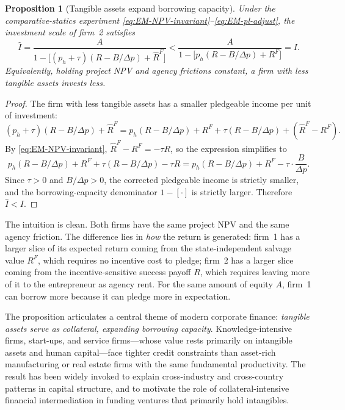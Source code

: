 \documentclass[11pt,a4paper,oneside]{book}
\theoremstyle{plain}
\newtheorem{proposition}[theorem]{Proposition}
\theoremstyle{definition}
\theoremstyle{remark}
\numberwithin{equation}{chapter}
\begin{document}
\begin{proposition}[Tangible assets expand borrowing capacity]\label{prop:EM-tangible}
Under the comparative-statics experiment \eqref{eq:EM-NPV-invariant}--\eqref{eq:EM-pl-adjust}, the investment scale of firm~2 satisfies
\begin{equation}\label{eq:EM-tangible-inequality}
  \widehat{I} = \frac{A}{1 - \bigl[ (p_h + \tau)(R - B/\Delta p) + \widehat{R}^F \bigr]} < \frac{A}{1 - \bigl[ p_h(R - B/\Delta p) + R^F \bigr]} = I.
\end{equation}
Equivalently, holding project NPV and agency frictions constant, a firm with less tangible assets invests less.
\end{proposition}

\begin{proof}
The firm with less tangible assets has a smaller pledgeable income per unit of investment:
\begin{equation*}
  (p_h + \tau)(R - B/\Delta p) + \widehat{R}^F = p_h(R - B/\Delta p) + R^F + \tau(R - B/\Delta p) + (\widehat{R}^F - R^F).
\end{equation*}
By \eqref{eq:EM-NPV-invariant}, $\widehat{R}^F - R^F = -\tau R$, so the expression simplifies to
\begin{equation*}
  p_h(R - B/\Delta p) + R^F + \tau(R - B/\Delta p) - \tau R = p_h(R - B/\Delta p) + R^F - \tau \cdot \frac{B}{\Delta p}.
\end{equation*}
Since $\tau > 0$ and $B/\Delta p > 0$, the corrected pledgeable income is strictly smaller, and the borrowing-capacity denominator $1 - [\cdot]$ is strictly larger.
Therefore $\widehat{I} < I$.
\end{proof}

The intuition is clean.
Both firms have the same project NPV and the same agency friction.
The difference lies in \emph{how} the return is generated: firm~1 has a larger slice of its expected return coming from the state-independent salvage value $R^F$, which requires no incentive cost to pledge; firm~2 has a larger slice coming from the incentive-sensitive success payoff $R$, which requires leaving more of it to the entrepreneur as agency rent.
For the same amount of equity $A$, firm~1 can borrow more because it can pledge more in expectation.

The proposition articulates a central theme of modern corporate finance: \emph{tangible assets serve as collateral, expanding borrowing capacity}.
Knowledge-intensive firms, start-ups, and service firms---whose value rests primarily on intangible assets and human capital---face tighter credit constraints than asset-rich manufacturing or real estate firms with the same fundamental productivity.
The result has been widely invoked to explain cross-industry and cross-country patterns in capital structure, and to motivate the role of collateral-intensive financial intermediation in funding ventures that primarily hold intangibles.
\end{document}
